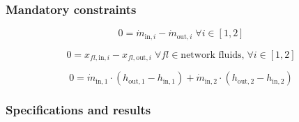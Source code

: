 \documentclass[]{article}
\begin{document}
\subsubsection{Mandatory constraints}

\begin{equation}
\label{eq:HeatExchanger_mass_flow_constraints}
0=\dot{m}_{\mathrm{in,}i}-\dot{m}_{\mathrm{out,}i}\; \forall i \in [1, 2]
\end{equation}

\begin{equation}
\label{eq:HeatExchanger_fluid_constraints}
0=x_{fl\mathrm{,in,}i}-x_{fl\mathrm{,out,}i}\;\forall fl \in\text{network fluids,}\; \forall i \in [1, 2]
\end{equation}

\begin{equation}
\label{eq:HeatExchanger_energy_balance_constraints}
0 = \dot{m}_\mathrm{in,1} \cdot \left(h_\mathrm{out,1} - h_\mathrm{in,1} \right) +\dot{m}_\mathrm{in,2} \cdot \left(h_\mathrm{out,2} - h_\mathrm{in,2} \right)
\end{equation}


\subsubsection{Specifications and results}
\end{document}
